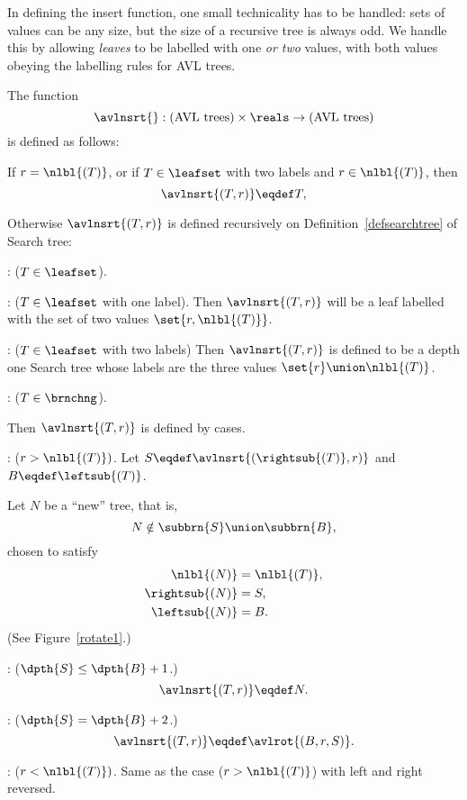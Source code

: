\begin{definition}
In defining the insert function, one small technicality has to be
handled: sets of values can be any size, but the size of a recursive
tree is always odd.  We handle this by allowing \emph{leaves} to be
labelled with one \emph{or two} values, with both values obeying the
labelling rules for AVL trees.

\begin{definition}
The function
\[
\avlnsrt{}: \text{(AVL trees)} \times \reals \to \text{(AVL trees)}
\]
is defined as follows:

If $r = \nlbl{(T)}$, or if $T \in \leafset$ with two labels and $r \in
\nlbl{(T)}$, then
\[
\avlnsrt{(T,r)} \eqdef T,
\]

Otherwise $\avlnsrt{(T,r)}$ is defined recursively on
Definition~\ref{defsearchtree} of Search tree:

: ($T \in \leafset$).

: ($T \in \leafset$ with one label).  Then
$\avlnsrt{(T,r)}$ will be a leaf labelled with the set of two values
$\set{r,\nlbl{(T)}}$.

: ($T \in \leafset$ with two labels) Then
$\avlnsrt{(T,r)}$ is defined to be a depth one Search tree whose
labels are the three values $\set{r} \union \nlbl{(T)}$.

: ($T \in \brnchng$).  

Then $\avlnsrt{(T,r)}$ is defined by cases.

: ($r > \nlbl{(T)})$.  Let $S \eqdef
\avlnsrt{(\rightsub{(T)}, r)}$ and $B \eqdef \leftsub{(T)}$.

Let $N$ be a ``new'' tree, that is,
\[
N \notin \subbrn{S} \union \subbrn{B},
\]
chosen to satisfy
\begin{align}
\nlbl{(N)} & = \nlbl{(T)},\\
\rightsub{(N)} & = S,\\
\leftsub{(N)} & = B.
\end{align}
(See Figure~\ref{rotate1}.)

: ($\dpth{S} \leq \dpth{B}+1$.)
\[
\avlnsrt{(T,r)} \eqdef N.
\]

: ($\dpth{S} = \dpth{B}+2$.)
\[
\avlnsrt{(T,r)} \eqdef \avlrot{(B,r,S)}.
\]

: ($r < \nlbl{(T)})$.  Same as the case ($r >
\nlbl{(T)}$) with left and right reversed.
\end{definition}


\end{definition}
